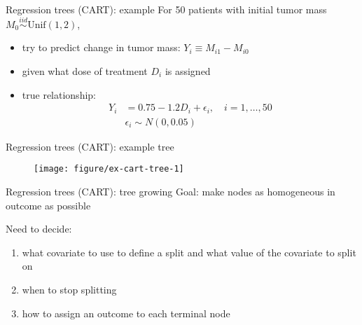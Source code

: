 \documentclass{beamer}
\begin{document}
\begin{frame}{Regression trees (CART): example}
  For 50 patients with initial tumor mass $M_{0} \overset{iid}{\sim} \text{Unif}(1, 2)$,
  \begin{itemize}[<+->]
    \item try to predict change in tumor mass: $Y_{i} \equiv M_{i1} - M_{i0}$
    \item given what dose of treatment $D_{i}$ is assigned
    \item true relationship:
    \begin{align*}
      Y_{i} &= 0.75 - 1.2 D_{i} + \epsilon_{i}, \quad i = 1, \ldots, 50 \\
      & \epsilon_{i} \sim N(0, 0.05)
    \end{align*}
     
  \end{itemize}
  
\end{frame}

\begin{frame}[c]{Regression trees (CART): example tree}
  \begin{figure}[!htbp]
  \begin{center}
    \texttt{[image: figure/ex-cart-tree-1]}
  \end{center}
  \end{figure}
\end{frame}

\begin{frame}{Regression trees (CART): tree growing}
  Goal: make nodes as homogeneous in outcome as possible
  
  \pause
  Need to decide:
  \begin{enumerate}[<+->]
    \item what covariate to use to define a split and what value of the covariate to split on
    \item when to stop splitting
    \item how to assign an outcome to each terminal node
  \end{enumerate}
\end{frame}
\end{document}
